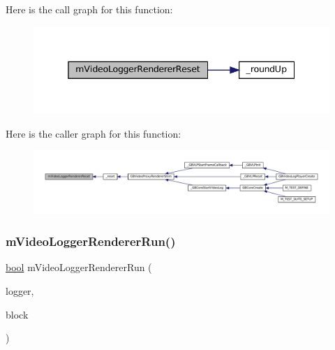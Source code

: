 Here is the call graph for this function\+:
\nopagebreak
\begin{figure}[H]
\begin{center}
\leavevmode
\includegraphics[width=338pt]{video-logger_8c_adeafad306d275ef128d6f88bb2c28ea0_cgraph}
\end{center}
\end{figure}
Here is the caller graph for this function\+:
\nopagebreak
\begin{figure}[H]
\begin{center}
\leavevmode
\includegraphics[width=350pt]{video-logger_8c_adeafad306d275ef128d6f88bb2c28ea0_icgraph}
\end{center}
\end{figure}
\mbox{\label{video-logger_8c_ab790ed3e764c170c154f5781ecba758d}} 
\subsubsection{\texorpdfstring{m\+Video\+Logger\+Renderer\+Run()}{mVideoLoggerRendererRun()}}
{\footnotesize\ttfamily \mbox{\hyperlink{libretro_8h_a4a26dcae73fb7e1528214a068aca317e}{bool}} m\+Video\+Logger\+Renderer\+Run (\begin{DoxyParamCaption}\item[{struct m\+Video\+Logger $\ast$}]{logger,  }\item[{\mbox{\hyperlink{libretro_8h_a4a26dcae73fb7e1528214a068aca317e}{bool}}}]{block }\end{DoxyParamCaption})}

